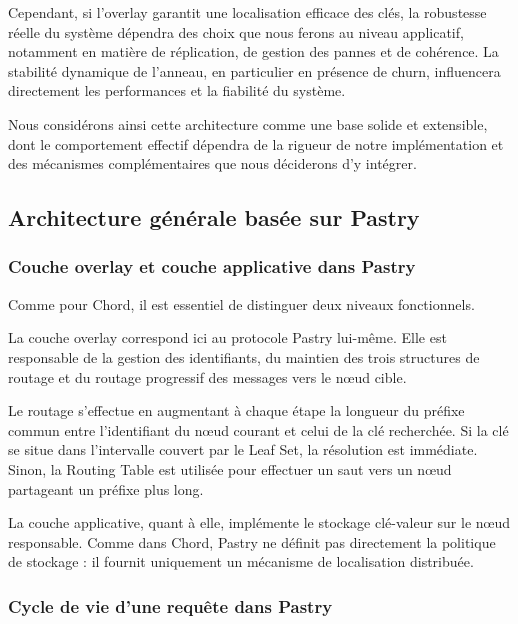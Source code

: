 Cependant, si l'overlay garantit une localisation efficace des cl\'es, la robustesse r\'eelle du syst\`eme d\'ependra des choix que nous ferons au niveau applicatif, notamment en mati\`ere de r\'eplication, de gestion des pannes et de coh\'erence. La stabilit\'e dynamique de l'anneau, en particulier en pr\'esence de churn, influencera directement les performances et la fiabilit\'e du syst\`eme.

Nous consid\'erons ainsi cette architecture comme une base solide et extensible, dont le comportement effectif d\'ependra de la rigueur de notre impl\'ementation et des m\'ecanismes compl\'ementaires que nous d\'eciderons d'y int\'egrer.

\subsection{Architecture g\'en\'erale bas\'ee sur Pastry}

\subsubsection{Couche overlay et couche applicative dans Pastry}

Comme pour Chord, il est essentiel de distinguer deux niveaux fonctionnels.

La couche overlay correspond ici au protocole Pastry lui-m\^eme. Elle est responsable de la gestion des identifiants, du maintien des trois structures de routage et du routage progressif des messages vers le n\oe ud cible.

Le routage s'effectue en augmentant \`a chaque \'etape la longueur du pr\'efixe commun entre l'identifiant du n\oe ud courant et celui de la cl\'e recherch\'ee. Si la cl\'e se situe dans l'intervalle couvert par le Leaf Set, la r\'esolution est imm\'ediate. Sinon, la Routing Table est utilis\'ee pour effectuer un saut vers un n\oe ud partageant un pr\'efixe plus long.

La couche applicative, quant \`a elle, impl\'emente le stockage cl\'e-valeur sur le n\oe ud responsable. Comme dans Chord, Pastry ne d\'efinit pas directement la politique de stockage : il fournit uniquement un m\'ecanisme de localisation distribu\'ee.


\subsubsection{Cycle de vie d'une requ\^ete dans Pastry}


